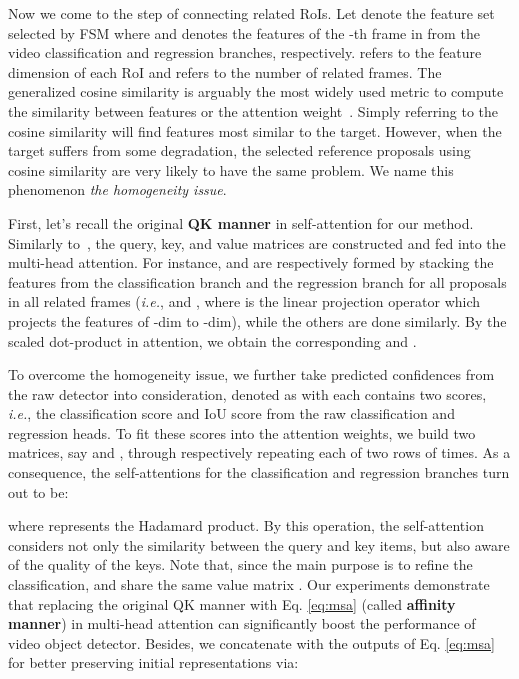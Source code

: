 \documentclass[letterpaper]{article} \usepackage{aaai23}  \usepackage{times}  \usepackage{helvet}  \usepackage{courier}  \usepackage[hyphens]{url}  \usepackage{graphicx} \urlstyle{rm} \def\UrlFont{\rm}  \usepackage{natbib}  \usepackage{caption} \usepackage{xcolor}
\begin{document}
Now we come to the step of connecting related RoIs.
Let  denote the feature set selected by FSM where  and  denotes the features of the -th frame in  from the video classification and regression branches, respectively.  refers to the feature dimension of each RoI and  refers to the number of related frames. The generalized cosine similarity is arguably the most widely used metric to compute the similarity between features or the attention weight~\cite{wu2019sequence,shvets2019leveraging,deng2019relation}. Simply referring to the cosine similarity will find features most similar to the target. However, when the target suffers from some degradation, the selected reference proposals using cosine similarity are very likely to have the same problem. We name this phenomenon \emph{the homogeneity issue}. 

First, let's recall the original \textbf{QK manner} in self-attention for our method. Similarly to~\cite{vaswani2017attention}, the query, key, and value matrices are constructed and fed into the multi-head attention. 
For instance,  and  are respectively formed by stacking the features from the classification branch and the regression branch for all proposals in all related frames (\emph{i.e.},  and , where  is the linear projection operator which projects the features of -dim to -dim), while the others are done similarly.
By the scaled dot-product in attention, we obtain the corresponding  and .  

To overcome the homogeneity issue, we further take predicted confidences from the raw detector into consideration, denoted as  with each  contains two scores, \emph{i.e.}, the classification score and IoU score from the raw classification and regression heads. 
To fit these scores into the attention weights, we build two matrices, say  and , through respectively repeating each of two rows of   times. As a consequence, the self-attentions for the classification and regression branches turn out to be:

where  represents the Hadamard product. By this operation, the self-attention considers not only the similarity between the query and key items, but also aware of the quality of the keys. Note that, since the main purpose is to refine the classification,  and  share the same value matrix .
Our experiments demonstrate that replacing the original QK manner with Eq. \eqref{eq:msa} (called \textbf{affinity manner}) in multi-head attention can significantly boost the performance of video object detector. Besides, we concatenate  with the outputs of Eq. \eqref{eq:msa} for better preserving initial representations via:
  
\end{document}
